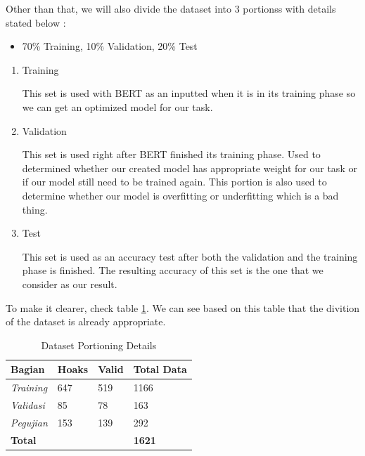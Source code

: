 Other than that, we will also divide the dataset into 3 portionss with details stated below :

\begin{itemize}
    \item 70\% Training, 10\% Validation, 20\% Test
\end{itemize}

\begin{enumerate}
    \item Training

          This set is used with BERT as an inputted when it is in its training phase so we can get an optimized model for our task.

    \item Validation

          This set is used right after BERT finished its training phase. Used to determined whether our created model has appropriate weight for our task or if our model still need to be trained again. This portion is also used to determine whether our model is overfitting or underfitting which is a bad thing.

    \item Test

          This set is used as an accuracy test after both the validation and the training phase is finished. The resulting accuracy of this set is the one that we consider as our result.

\end{enumerate}

To make it clearer, check table \ref{tab:dataset_section}. We can see based on this table that the divition of the dataset is already appropriate.

\begin{table}[h]
    \caption{Dataset Portioning Details}
    \label{tab:dataset_section}
    \centering
    \begin{tabular}{ | l | l | l | l | }
        \hline
        \textbf{Bagian}                      & \textbf{Hoaks} & \textbf{Valid} & \textbf{Total Data} \\ \hline
        \textit{Training}                    & 647            & 519            & 1166                \\ \hline
        \textit{Validasi}                    & 85             & 78             & 163                 \\ \hline
        \textit{Pegujian}                    & 153            & 139            & 292                 \\ \hline
        \multicolumn{3}{|l|}{\textbf{Total}} & \textbf{1621}                                         \\ \hline
    \end{tabular}
\end{table}

